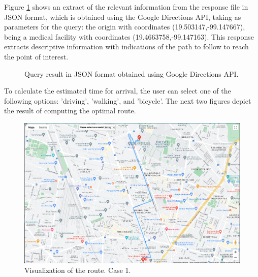 \documentclass[sustainability,article,submit,pdftex,moreauthors]{Definitions/mdpi}
\begin{document}

Figure \ref{figure_query_one} shows an extract of the relevant information from the response file in JSON format, which is obtained using the Google Directions API, taking as parameters for the query: the origin with coordinates (19.503147,-99.147667), being a medical facility with coordinates (19.4663758,-99.147163). This response extracts descriptive information with indications of the path to follow to reach the point of interest.

\begin{figure}[H]

\caption{Query result in JSON format obtained using Google Directions API. \\\label{figure_query_one}}
\end{figure}
\unskip

To calculate the estimated time for arrival, the user can select one of the following options: 'driving', 'walking', and 'bicycle'. The next two figures depict the result of computing the optimal route.


\begin{figure}[H]
\includegraphics[width=10.5 cm]{ruta_uno.png}
\caption{Visualization of the route. Case 1.\label{figure_ruta_uno}}
\end{figure}
\end{document}
